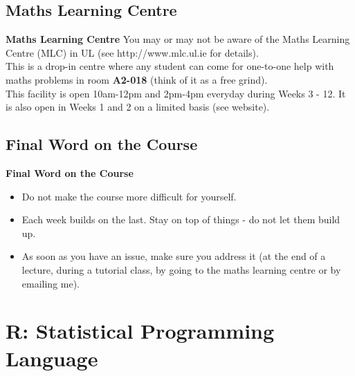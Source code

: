 \documentclass[compress]{beamer}        %
\makeatletter
\newcommand{\tcb}{\textcolor{beamer@blendedblue}}
\makeatother
\begin{document}
\subsection{Maths Learning Centre}
\begin{frame}{\bf \tcb{Maths Learning Centre}}
You may or may not be aware of the Maths Learning Centre (MLC) in UL (see \tcb{http://www.mlc.ul.ie} for details).\\[1cm]
This is a drop-in centre where any student can come for one-to-one help with maths problems in room {\bf A2-018} (think of it as a free grind).\\[1cm]
This facility is open 10am-12pm and 2pm-4pm everyday during Weeks 3 - 12. It is also open in Weeks 1 and 2 on a limited basis (see website).%
\end{frame}



\subsection{Final Word on the Course}
\begin{frame}{\bf \tcb{Final Word on the Course}}
\begin{itemize}\itemsep1cm
\item Do not make the course more difficult for yourself.
\item Each week builds on the last. Stay on top of things - do not let them build up.
\item As soon as you have an issue, make sure you address it (at the end of a lecture, during a tutorial class, by going to the maths learning centre or by emailing me).
\end{itemize}
\end{frame}


\section{R: Statistical Programming Language}
\end{document}
